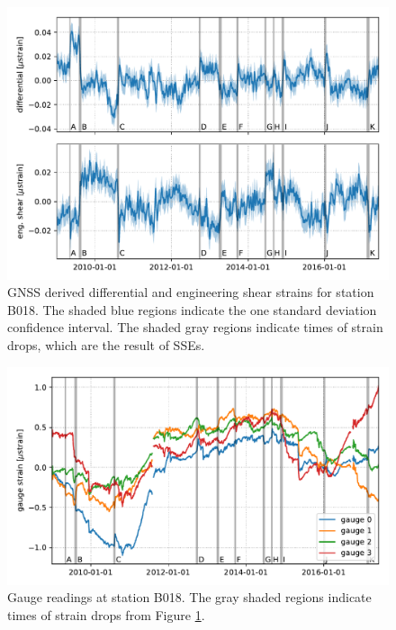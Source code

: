 \begin{figure}
\includegraphics{ch5/appendix_figures/gnss.pdf}
\caption{GNSS derived differential and engineering shear strains for
station B018. The shaded blue regions indicate the one standard
deviation confidence interval. The shaded gray regions indicate times
of strain drops, which are the result of SSEs.}
\label{fig:Gnss}
\end{figure}

\begin{figure}
\includegraphics{ch5/appendix_figures/gauge.pdf}
\caption{Gauge readings at station B018. The gray shaded regions
indicate times of strain drops from Figure \ref{fig:Gnss}.}
\label{fig:Gauge}
\end{figure}

